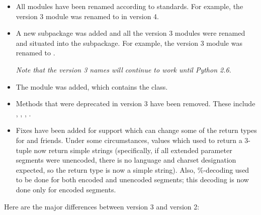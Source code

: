 \begin{itemize}
\item All modules have been renamed according to  standards.  For
      example, the version 3 module  was renamed to
       in version 4.

\item A new subpackage  was added and all the version 3
       modules were renamed and situated into the
       subpackage.  For example, the version 3 module
       was renamed to .

      \emph{Note that the version 3 names will continue to work until Python
      2.6}.

\item The  module was added, which contains the
       class.

\item Methods that were deprecated in version 3 have been removed.  These
      include , ,
      , .

\item Fixes have been added for  support which can change some of
      the return types for  and friends.  Under
      some circumstances, values which used to return a 3-tuple now return
      simple strings (specifically, if all extended parameter segments were
      unencoded, there is no language and charset designation expected, so the
      return type is now a simple string).  Also, \%-decoding used to be done
      for both encoded and unencoded segments; this decoding is now done only
      for encoded segments.
\end{itemize}

Here are the major differences between  version 3 and version 2:

